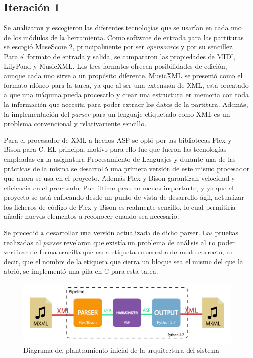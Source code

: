 \subsection{Iteración 1}
\label{subsec:first_iteration}
Se analizaron y escogieron las diferentes tecnologías que se usarían en cada uno de los módulos de la herramienta. 
Como software de entrada para las partituras se escogió MuseScore 2, principalmente por ser \textit{opensource} y por su sencillez. Para el formato de entrada y salida, se compararon las propiedades de MIDI, LilyPond y MusicXML. Los tres formatos ofrecen posibilidades de edición, aunque cada uno sirve a un propósito diferente. MusicXML se presentó como el formato idóneo para la tarea, ya que al ser una extensión de XML, está orientado a que una máquina pueda procesarlo y crear una estructura en memoria con toda la información que necesita para poder extraer los datos de la partitura. Además, la implementación del \textit{parser} para un lenguaje etiquetado como XML es un problema convencional y relativamente sencillo.

Para el procesador de XML a hechos ASP se optó por las bibliotecas Flex y Bison para C. EL principal motivo para ello fue que fueron las tecnologías empleadas en la asignatura Procesamiento de Lenguajes y durante una de las prácticas de la misma se desarrolló una primera versión de este mismo procesador que ahora se usa en el proyecto. Además Flex y Bison garantizan velocidad y eficiencia en el procesado. Por último pero no menos importante, y ya que el proyecto se está enfocando desde un punto de vista de desarrollo ágil, actualizar los ficheros de código de Flex y Bison es realmente sencillo, lo cual permitiría añadir nuevos elementos a reconocer cuando sea necesario.

Se procedió a desarrollar una versión actualizada de dicho parser. Las pruebas realizadas al \textit{parser} revelaron que existía un problema de análisis al no poder verificar de forma sencilla que cada etiqueta se cerraba de modo correcto, es decir, que el nombre de la etiqueta que cierra un bloque sea el mismo del que la abrió, se implementó una pila en C para esta tarea. 

\begin{figure}
	\centering
	\includegraphics[width=0.8\linewidth]{imagenes/arquitectura_inicial.pdf}
	\caption{Diagrama del planteamiento inicial de la arquitectura del sistema}
	\label{fig:arquitectura_inicial}
\end{figure}

